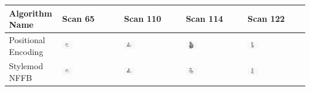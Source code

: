 \begin{table}[H]
\begin{tabularx}{\textwidth}{|p{3.2cm}|X|X|X|X|}
\hline
Algorithm Name & Scan 65 & Scan 110 & Scan 114 & Scan 122 \\
\hline
Positional Encoding & \includegraphics[width=0.2\textwidth]{images/chapter5_img/MeshReconResults/PositionalEncoding/65-HiddenView.jpg} & \includegraphics[width=0.2\textwidth]{images/chapter5_img/MeshReconResults/PositionalEncoding/110-HiddenView.jpg} & \includegraphics[width=0.2\textwidth]{images/chapter5_img/MeshReconResults/PositionalEncoding/114-HiddenView.jpg} & \includegraphics[width=0.2\textwidth]{images/chapter5_img/MeshReconResults/PositionalEncoding/122-HiddenView.jpg} \\
\hline
Stylemod NFFB & \includegraphics[width=0.2\textwidth]{images/chapter5_img/MeshReconResults/StylemodNFFB/65_HiddenView.jpg} & \includegraphics[width=0.2\textwidth]{images/chapter5_img/MeshReconResults/StylemodNFFB/110_HiddenView.jpg} & \includegraphics[width=0.2\textwidth]{images/chapter5_img/MeshReconResults/StylemodNFFB/114_HiddenView.jpg} & \includegraphics[width=0.2\textwidth]{images/chapter5_img/MeshReconResults/StylemodNFFB/122_HiddenView.jpg} \\

\end{tabularx}
\end{table}
